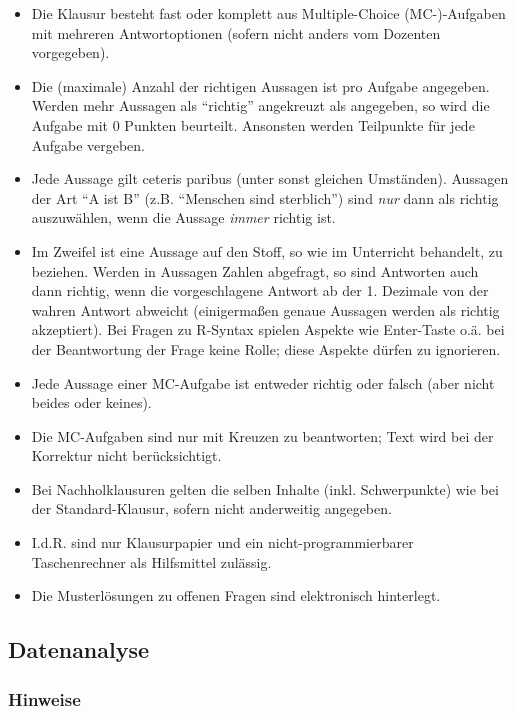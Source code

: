 \documentclass[12pt,ngerman,]{book}
\theoremstyle{definition}
\theoremstyle{definition}
\theoremstyle{remark}
\begin{document}
\begin{itemize}
\item
  Die Klausur besteht fast oder komplett aus Multiple-Choice
  (MC-)-Aufgaben mit mehreren Antwortoptionen (sofern nicht anders vom
  Dozenten vorgegeben).
\item
  Die (maximale) Anzahl der richtigen Aussagen ist pro Aufgabe
  angegeben. Werden mehr Aussagen als ``richtig'' angekreuzt als
  angegeben, so wird die Aufgabe mit 0 Punkten beurteilt. Ansonsten
  werden Teilpunkte für jede Aufgabe vergeben.
\item
  Jede Aussage gilt ceteris paribus (unter sonst gleichen Umständen).
  Aussagen der Art ``A ist B'' (z.B. ``Menschen sind sterblich'') sind
  \emph{nur} dann als richtig auszuwählen, wenn die Aussage \emph{immer}
  richtig ist.
\item
  Im Zweifel ist eine Aussage auf den Stoff, so wie im Unterricht
  behandelt, zu beziehen. Werden in Aussagen Zahlen abgefragt, so sind
  Antworten auch dann richtig, wenn die vorgeschlagene Antwort ab der 1.
  Dezimale von der wahren Antwort abweicht (einigermaßen genaue Aussagen
  werden als richtig akzeptiert). Bei Fragen zu R-Syntax spielen Aspekte
  wie Enter-Taste o.ä. bei der Beantwortung der Frage keine Rolle; diese
  Aspekte dürfen zu ignorieren.
\item
  Jede Aussage einer MC-Aufgabe ist entweder richtig oder falsch (aber
  nicht beides oder keines).
\item
  Die MC-Aufgaben sind nur mit Kreuzen zu beantworten; Text wird bei der
  Korrektur nicht berücksichtigt.
\item
  Bei Nachholklausuren gelten die selben Inhalte (inkl. Schwerpunkte)
  wie bei der Standard-Klausur, sofern nicht anderweitig angegeben.
\item
  I.d.R. sind nur Klausurpapier und ein nicht-programmierbarer
  Taschenrechner als Hilfsmittel zulässig.
\item
  Die Musterlösungen zu offenen Fragen sind elektronisch hinterlegt.
\end{itemize}

\subsection{Datenanalyse}\label{datenanalyse}

\subsubsection{Hinweise}\label{hinweise}
\end{document}

